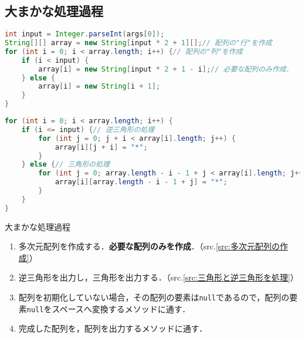 \documentclass[a4j,11pt]{jsarticle}
\begin{document}
\subsection{大まかな処理過程}
\begin{lstlisting}[caption=多次元配列の作成, label=src:多次元配列の作成, language=Java]
int input = Integer.parseInt(args[0]);
String[][] array = new String[input * 2 + 1][];// 配列の"行"を作成
for (int i = 0; i < array.length; i++) {// 配列の"列"を作成
    if (i < input) {
        array[i] = new String[input * 2 + 1 - i];// 必要な配列のみ作成．
    } else {
        array[i] = new String[i + 1];
    }
}
\end{lstlisting}
\begin{lstlisting}[caption=三角形と逆三角形を処理, label=src:三角形と逆三角形を処理, language=java]
for (int i = 0; i < array.length; i++) {
    if (i <= input) {// 逆三角形の処理
        for (int j = 0; j + i < array[i].length; j++) {
            array[i][j + i] = "*";
        }
    } else {// 三角形の処理
        for (int j = 0; array.length - i - 1 + j < array[i].length; j++) {
            array[i][array.length - i - 1 + j] = "*";
        }
    }
}
\end{lstlisting}

大まかな処理過程
\begin{enumerate}
\renewcommand{\labelenumi}{\arabic{enumi})}
\item 多次元配列を作成する．\textbf{必要な配列のみを作成}．（src.\ref{src:多次元配列の作成}）
\item 逆三角形を出力し，三角形を出力する．（src.\ref{src:三角形と逆三角形を処理}）
\item 配列を初期化していない場合，その配列の要素は\verb|null|であるので，配列の要素\verb|null|をスペースへ変換するメソッドに通す．
\item 完成した配列を，配列を出力するメソッドに通す．
\end{enumerate}
\newpage
\end{document}
